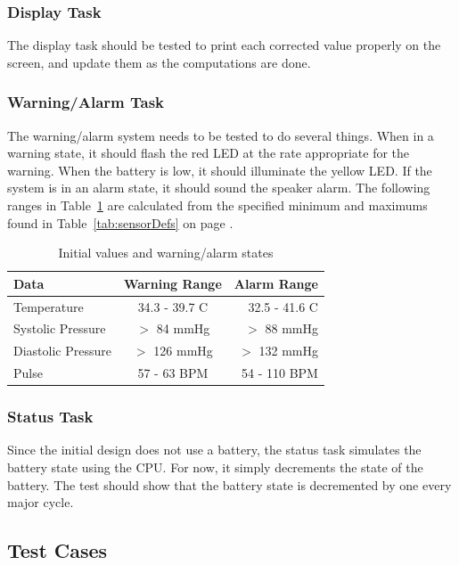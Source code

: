 \documentclass[12pt]{article} %
\begin{document}
    \subsubsection{Display Task}
    The display task should be tested to print each corrected value properly on
    the screen, and update them as the computations are done.

    \subsubsection{Warning/Alarm Task} 
    The warning/alarm system needs to be tested to do several things. When in a
    warning state, it should flash the red LED at the rate appropriate for the
    warning. When the battery is low, it should illuminate the yellow LED. If the
    system is in an alarm state, it should sound the speaker alarm. The following
    ranges in Table~\ref{tab:ranges} are calculated from the specified minimum and
    maximums found in Table~\ref{tab:sensorDefs} on page \pageref{tab:sensorDefs}.
    \begin{table}[h]
      \centering
      \begin{tabular}{lcr} 
	\toprule
	Data & Warning Range & Alarm Range \\
	\midrule
	Temperature & 34.3 - 39.7 C & 32.5 - 41.6 C\\
	Systolic Pressure & $>$ 84 mmHg & $>$ 88 mmHg\\
	Diastolic Pressure & $>$ 126 mmHg & $>$ 132 mmHg\\
	Pulse & 57 - 63 BPM & 54 - 110 BPM \\
	\bottomrule
      \end{tabular}
      \caption{Initial values and warning/alarm states}
      \label{tab:ranges}
    \end{table}

    \subsubsection{Status Task}
    Since the initial design does not use a battery, the status task simulates the
    battery state using the CPU. For now, it simply decrements the state of the
    battery. The test should show that the battery state is decremented by one
    every major cycle.

    \subsection{Test Cases}
\end{document}
